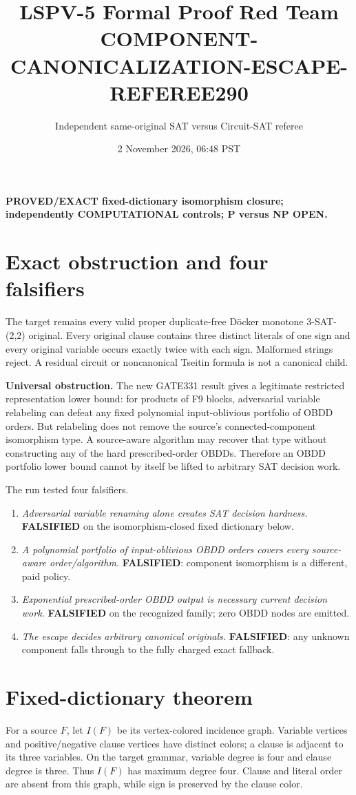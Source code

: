 \documentclass[11pt]{article}
\title{LSPV-5 Formal Proof Red Team\\COMPONENT-CANONICALIZATION-ESCAPE-REFEREE290}
\author{Independent same-original SAT versus Circuit-SAT referee}
\date{2 November 2026, 06:48 PST}
\begin{document}
\maketitle

\noindent\textbf{PROVED/EXACT fixed-dictionary isomorphism closure; independently COMPUTATIONAL controls; P versus NP OPEN.}

\section{Exact obstruction and four falsifiers}
The target remains every valid proper duplicate-free D\"ocker monotone
3-SAT-(2,2) original.  Every original clause contains three distinct literals
of one sign and every original variable occurs exactly twice with each sign.
Malformed strings reject.  A residual circuit or noncanonical Tseitin formula
is not a canonical child.

\textbf{Universal obstruction.}  The new GATE331 result gives a legitimate
restricted representation lower bound: for products of F9 blocks, adversarial
variable relabeling can defeat any fixed polynomial input-oblivious portfolio
of OBDD orders.  But relabeling does not remove the source's connected-component
isomorphism type.  A source-aware algorithm may recover that type without
constructing any of the hard prescribed-order OBDDs.  Therefore an OBDD
portfolio lower bound cannot by itself be lifted to arbitrary SAT decision
work.

The run tested four falsifiers.
\begin{enumerate}
\item \emph{Adversarial variable renaming alone creates SAT decision
hardness.} \textbf{FALSIFIED} on the isomorphism-closed fixed dictionary below.
\item \emph{A polynomial portfolio of input-oblivious OBDD orders covers every
source-aware order/algorithm.} \textbf{FALSIFIED}: component isomorphism is a
different, paid policy.
\item \emph{Exponential prescribed-order OBDD output is necessary current
decision work.} \textbf{FALSIFIED} on the recognized family; zero OBDD nodes
are emitted.
\item \emph{The escape decides arbitrary canonical originals.}
\textbf{FALSIFIED}: any unknown component falls through to the fully charged
exact fallback.
\end{enumerate}

\section{Fixed-dictionary theorem}
For a source $F$, let $I(F)$ be its vertex-colored incidence graph.  Variable
vertices and positive/negative clause vertices have distinct colors; a clause
is adjacent to its three variables.  On the target grammar, variable degree is
four and clause degree is three.  Thus $I(F)$ has maximum degree four.  Clause
and literal order are absent from this graph, while sign is preserved by the
clause color.
\end{document}

